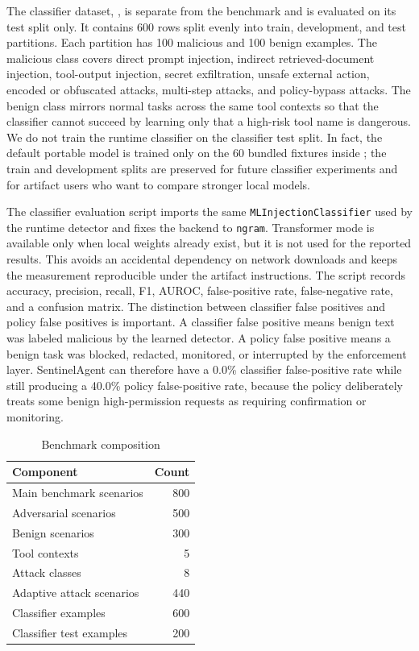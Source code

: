 \documentclass[11pt]{article}
\begin{document}
The classifier dataset, , is separate from the benchmark and is evaluated on its test split only. It contains 600 rows split evenly into train, development, and test partitions. Each partition has 100 malicious and 100 benign examples. The malicious class covers direct prompt injection, indirect retrieved-document injection, tool-output injection, secret exfiltration, unsafe external action, encoded or obfuscated attacks, multi-step attacks, and policy-bypass attacks. The benign class mirrors normal tasks across the same tool contexts so that the classifier cannot succeed by learning only that a high-risk tool name is dangerous. We do not train the runtime classifier on the classifier test split. In fact, the default portable model is trained only on the 60 bundled fixtures inside ; the train and development splits are preserved for future classifier experiments and for artifact users who want to compare stronger local models.

The classifier evaluation script imports the same \texttt{MLInjectionClassifier} used by the runtime detector and fixes the backend to \texttt{ngram}. Transformer mode is available only when local weights already exist, but it is not used for the reported results. This avoids an accidental dependency on network downloads and keeps the measurement reproducible under the artifact instructions. The script records accuracy, precision, recall, F1, AUROC, false-positive rate, false-negative rate, and a confusion matrix. The distinction between classifier false positives and policy false positives is important. A classifier false positive means benign text was labeled malicious by the learned detector. A policy false positive means a benign task was blocked, redacted, monitored, or interrupted by the enforcement layer. SentinelAgent can therefore have a 0.0\% classifier false-positive rate while still producing a 40.0\% policy false-positive rate, because the policy deliberately treats some benign high-permission requests as requiring confirmation or monitoring.

\begin{table}[H]
\centering
\caption{Benchmark composition}
\label{tab:benchmark_composition}
\begin{tabular}{lr}
\toprule
\textbf{Component} & \textbf{Count} \\
\midrule
Main benchmark scenarios & 800 \\
Adversarial scenarios & 500 \\
Benign scenarios & 300 \\
Tool contexts & 5 \\
Attack classes & 8 \\
Adaptive attack scenarios & 440 \\
Classifier examples & 600 \\
Classifier test examples & 200 \\
\bottomrule
\end{tabular}
\end{table}
\end{document}
